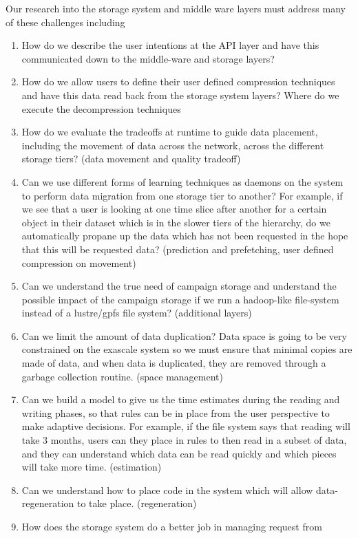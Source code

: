 Our research into the storage system and middle ware layers must address
many of these challenges including
\begin{enumerate}
\item How do we describe the user intentions at the API layer and have this
  communicated down to the middle-ware and storage layers?
\item How do we allow users to define their user defined compression
  techniques and have this data read back from the storage system layers?
  Where do we execute the decompression techniques 
\item How do we evaluate the tradeoffs at runtime to guide data placement,
  including the movement of data across the network, across the different
  storage tiers? (data movement and quality tradeoff)
\item Can we use different forms of learning techniques as daemons on the
  system to perform data migration from one storage tier to another? For
  example, if we see that a user is looking at one time slice after another
  for a certain object in their dataset which is in the slower tiers of the
  hierarchy, do we automatically propane up the data which has not been
  requested in the hope that this will be requested data? (prediction and
  prefetching, user defined compression on movement)
\item Can we understand the true need of campaign storage and understand the
  possible impact of the campaign storage if we run a hadoop-like
  file-system instead of a lustre/gpfs file system? (additional layers)
\item Can we limit the amount of data duplication? Data space is going to be
  very constrained on the exascale system so we must ensure that minimal
  copies are made of data, and when data is duplicated, they are removed
  through a garbage collection routine. (space management)
\item Can we build a model to give us the time estimates during the reading
  and writing phases, so that rules can be in place from the user
  perspective to make adaptive decisions. For example, if the file system
  says that reading will take 3 months, users can they place in rules to
  then read in a subset of data, and they can understand which data can be
  read quickly and which pieces will take more time. (estimation)
\item Can we understand how to place code in the system which will allow
  data-regeneration to take place. (regeneration)
\item How does the storage system do a better job in managing request from

\end{enumerate}
